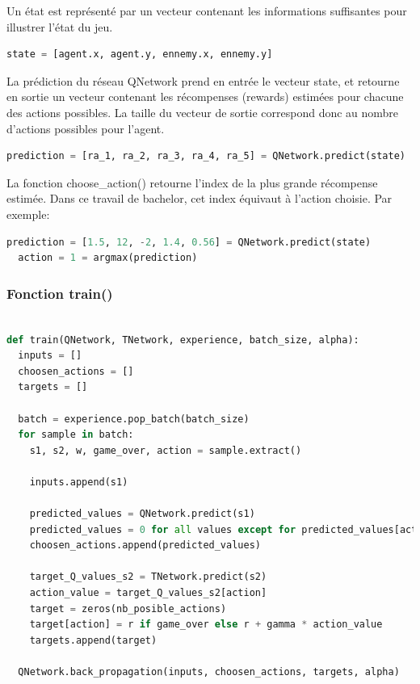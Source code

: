 \documentclass[11pt,a4paper]{report}
\begin{document}
  \par Un état est représenté par un vecteur contenant les informations suffisantes pour illustrer l'état du jeu.
  \begin{lstlisting}[language=python]
  state = [agent.x, agent.y, ennemy.x, ennemy.y]
  \end{lstlisting} 
  
  \par La prédiction du réseau QNetwork prend en entrée le vecteur state, et retourne en sortie un vecteur contenant les récompenses (rewards) estimées pour chacune des actions possibles. La taille du vecteur de sortie correspond donc au nombre d'actions possibles pour l'agent. 
  
  \begin{lstlisting}[language=python]
  prediction = [ra_1, ra_2, ra_3, ra_4, ra_5] = QNetwork.predict(state)
  \end{lstlisting} 
  
  \par La fonction choose\_action() retourne l'index de la plus grande récompense estimée. Dans ce travail de bachelor, cet index équivaut à l'action choisie. Par exemple: 
  
 \begin{lstlisting}[language=python]
  prediction = [1.5, 12, -2, 1.4, 0.56] = QNetwork.predict(state)
  action = 1 = argmax(prediction)
  \end{lstlisting}
  
   \subsubsection{Fonction train()}
     
  \begin{lstlisting}[language=python]
  
def train(QNetwork, TNetwork, experience, batch_size, alpha):
  inputs = []
  choosen_actions = []
  targets = []
 
  batch = experience.pop_batch(batch_size)
  for sample in batch:
    s1, s2, w, game_over, action = sample.extract()

    inputs.append(s1)
    
    predicted_values = QNetwork.predict(s1)
    predicted_values = 0 for all values except for predicted_values[action]
    choosen_actions.append(predicted_values)
    
    target_Q_values_s2 = TNetwork.predict(s2)
    action_value = target_Q_values_s2[action]
    target = zeros(nb_posible_actions)
    target[action] = r if game_over else r + gamma * action_value
    targets.append(target)
    
  QNetwork.back_propagation(inputs, choosen_actions, targets, alpha)
    \end{lstlisting} 
  
\end{document}
